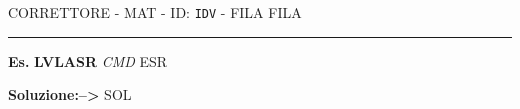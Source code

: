 \documentclass[a4paper,11pt]{article}
\begin{document}
\begin{center}
    {CORRETTORE - {MAT} - ID: \verb!IDV! - FILA {FILA}}
\end{center}

\hrule
\vspace{4pt}

\noindent \textbf{Es. } 
\textbf{{LVL}{ASR}} \textit{{CMD}} {ESR} 

\nopagebreak
\vspace{2pt}
\noindent \textbf{Soluzione:-->} {SOL} 
\par \vspace{12pt} 
\end{document}
